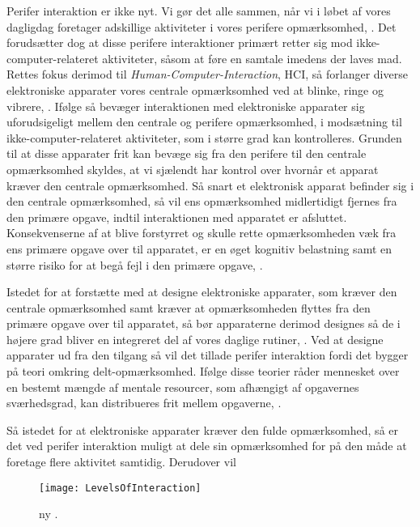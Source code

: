 Perifer interaktion er ikke nyt. Vi gør det alle sammen, når vi i løbet af vores dagligdag foretager adskillige aktiviteter i vores perifere opmærksomhed, \parencite[s. 1]{PDF:PeripheralInteraction}. Det forudsætter dog at disse perifere interaktioner primært retter sig mod ikke-computer-relateret aktiviteter, såsom at føre en samtale imedens der laves mad. Rettes fokus derimod til \textit{Human-Computer-Interaction}, HCI, så forlanger diverse elektroniske apparater vores centrale opmærksomhed ved at blinke, ringe og vibrere, \parencite[s. 1]{PDF:PeripheralInteraction}. Ifølge \textcite[s. 3]{PDF:PeripheralInteraction} så bevæger interaktionen med elektroniske apparater sig uforudsigeligt mellem den centrale og perifere opmærksomhed, i modsætning til ikke-computer-relateret aktiviteter, som i større grad kan kontrolleres. Grunden til at disse apparater frit kan bevæge sig fra den perifere til den centrale opmærksomhed skyldes, at vi sjælendt har kontrol over hvornår et apparat kræver den centrale opmærksomhed. Så snart et elektronisk apparat befinder sig i den centrale opmærksomhed, så vil ens opmærksomhed midlertidigt fjernes fra den primære opgave, indtil interaktionen med apparatet er afsluttet. Konsekvenserne af at blive forstyrret og skulle rette opmærksomheden væk fra ens primære opgave over til apparatet, er en øget kognitiv belastning samt en større risiko for at begå fejl i den primære opgave, \parencite[ss. 188-189][s. 162]{PDF:PeripheralInteraction, PDF:ComparingInputModalities}. 

Istedet for at forstætte med at designe elektroniske apparater, som kræver den centrale opmærksomhed samt kræver at opmærksomheden flyttes fra den primære opgave over til apparatet, så bør apparaterne derimod designes så de i højere grad bliver en integreret del af vores daglige rutiner, \parencite[s. 239]{PDF:PICharacteristicsAndConsiderations}. Ved at designe apparater ud fra den tilgang så vil det tillade perifer interaktion fordi det bygger på teori omkring delt-opmærksomhed. Ifølge disse teorier råder mennesket over en bestemt mængde af mentale resourcer, som afhængigt af opgavernes sværhedsgrad, kan distribueres frit mellem opgaverne, \parencite[s. 240]{PDF:PICharacteristicsAndConsiderations}.  



 Så istedet for at elektroniske apparater kræver den fulde opmærksomhed, så er det ved perifer interaktion muligt at dele sin opmærksomhed for på den måde at foretage flere aktivitet samtidig. Derudover vil       

  



%
\begin{figure}[H]
	\centering
	\texttt{[image: LevelsOfInteraction]}
	\caption{ny \textcite[s. 118]{PDF:PeripheralInteraction}.}
	\label{fig:LevelsOfInteraction}
\end{figure}
\noindent
%

